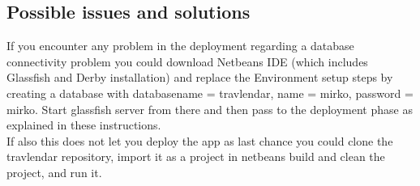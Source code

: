 \clearpage
\subsection{Possible issues and solutions}
If you encounter any problem in the deployment regarding a database connectivity problem you could download Netbeans IDE (which includes Glassfish and Derby installation) and replace the Environment setup steps by creating a database with databasename = travlendar, name = mirko, password = mirko.
Start glassfish server from there and then pass to the deployment phase as explained in these instructions.
\\If also this does not let you deploy the app as last chance you could clone the travlendar repository, import it as a project in netbeans build and clean the project, and run it.
